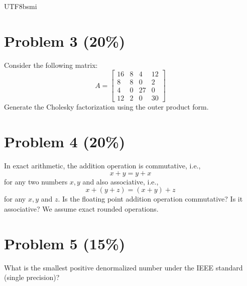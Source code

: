 \documentclass[12pt,a4paper]{article}
\begin{document}
\begin{CJK*}{UTF8}{bsmi}
\vspace{0.5cm}

\section*{Problem 3 (20\%)}
Consider the following matrix:
\[
A = \begin{bmatrix}
16 & 8 & 4 & 12 \\
8 & 8 & 0 & 2 \\
4 & 0 & 27 & 0 \\
12 & 2 & 0 & 30
\end{bmatrix}
\]
Generate the Cholesky factorization using the outer product form.

\vspace{0.5cm}

\section*{Problem 4 (20\%)}
In exact arithmetic, the addition operation is commutative, i.e.,
\[ x + y = y + x \]
for any two numbers $x, y$ and also associative, i.e.,
\[ x + (y + z) = (x + y) + z \]
for any $x, y$ and $z$. Is the floating point addition operation commutative? Is it associative? We assume exact rounded operations.

\vspace{0.5cm}

\section*{Problem 5 (15\%)}
What is the smallest positive denormalized number under the IEEE standard (single precision)?

\end{CJK*}
\end{document}
